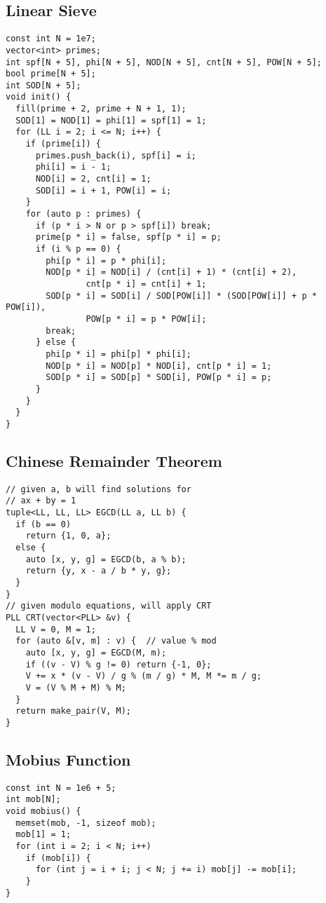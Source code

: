 \documentclass[FSZ,a4paper,onesided]{article}
\begin{document}
\begin{multicols*}{\COLS}
\subsection{Linear Sieve}
\begin{lstlisting}
const int N = 1e7;
vector<int> primes;
int spf[N + 5], phi[N + 5], NOD[N + 5], cnt[N + 5], POW[N + 5];
bool prime[N + 5];
int SOD[N + 5];
void init() {
  fill(prime + 2, prime + N + 1, 1);
  SOD[1] = NOD[1] = phi[1] = spf[1] = 1;
  for (LL i = 2; i <= N; i++) {
    if (prime[i]) {
      primes.push_back(i), spf[i] = i;
      phi[i] = i - 1;
      NOD[i] = 2, cnt[i] = 1;
      SOD[i] = i + 1, POW[i] = i;
    }
    for (auto p : primes) {
      if (p * i > N or p > spf[i]) break;
      prime[p * i] = false, spf[p * i] = p;
      if (i % p == 0) {
        phi[p * i] = p * phi[i];
        NOD[p * i] = NOD[i] / (cnt[i] + 1) * (cnt[i] + 2),
                cnt[p * i] = cnt[i] + 1;
        SOD[p * i] = SOD[i] / SOD[POW[i]] * (SOD[POW[i]] + p * POW[i]),
                POW[p * i] = p * POW[i];
        break;
      } else {
        phi[p * i] = phi[p] * phi[i];
        NOD[p * i] = NOD[p] * NOD[i], cnt[p * i] = 1;
        SOD[p * i] = SOD[p] * SOD[i], POW[p * i] = p;
      }
    }
  }
}

\end{lstlisting}
\subsection{Chinese Remainder Theorem}
\begin{lstlisting}
// given a, b will find solutions for
// ax + by = 1
tuple<LL, LL, LL> EGCD(LL a, LL b) {
  if (b == 0)
    return {1, 0, a};
  else {
    auto [x, y, g] = EGCD(b, a % b);
    return {y, x - a / b * y, g};
  }
}
// given modulo equations, will apply CRT
PLL CRT(vector<PLL> &v) {
  LL V = 0, M = 1;
  for (auto &[v, m] : v) {  // value % mod
    auto [x, y, g] = EGCD(M, m);
    if ((v - V) % g != 0) return {-1, 0};
    V += x * (v - V) / g % (m / g) * M, M *= m / g;
    V = (V % M + M) % M;
  }
  return make_pair(V, M);
}
\end{lstlisting}
\subsection{Mobius Function}
\begin{lstlisting}
const int N = 1e6 + 5;
int mob[N];
void mobius() {
  memset(mob, -1, sizeof mob);
  mob[1] = 1;
  for (int i = 2; i < N; i++)
    if (mob[i]) {
      for (int j = i + i; j < N; j += i) mob[j] -= mob[i];
    }
}


\end{lstlisting}
\end{multicols*}
\end{document}
